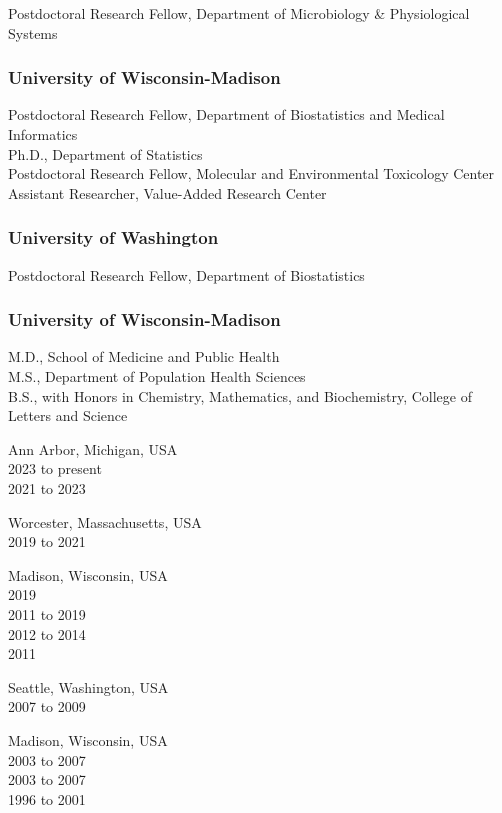 \documentclass[
  11pt,
]
{article}
\begin{document}
Postdoctoral Research Fellow, Department of Microbiology \&
Physiological Systems

\hypertarget{university-of-wisconsin-madison}{%
\subsubsection{University of
Wisconsin-Madison}\label{university-of-wisconsin-madison}}

Postdoctoral Research Fellow, Department of Biostatistics and Medical
Informatics\\
Ph.D., Department of Statistics\\
Postdoctoral Research Fellow, Molecular and Environmental Toxicology
Center\\
Assistant Researcher, Value-Added Research Center

\hypertarget{university-of-washington}{%
\subsubsection{University of
Washington}\label{university-of-washington}}

Postdoctoral Research Fellow, Department of Biostatistics

\hypertarget{university-of-wisconsin-madison-1}{%
\subsubsection{University of
Wisconsin-Madison}\label{university-of-wisconsin-madison-1}}

M.D., School of Medicine and Public Health\\
M.S., Department of Population Health Sciences\\
B.S., with Honors in Chemistry, Mathematics, and Biochemistry, College
of Letters and Science

Ann Arbor, Michigan, USA\\
2023 to present\\
2021 to 2023

Worcester, Massachusetts, USA\\
2019 to 2021

Madison, Wisconsin, USA\\
2019\\
2011 to 2019\\
2012 to 2014\\
2011

Seattle, Washington, USA\\
2007 to 2009

Madison, Wisconsin, USA\\
2003 to 2007\\
2003 to 2007\\
1996 to 2001
\end{document}
